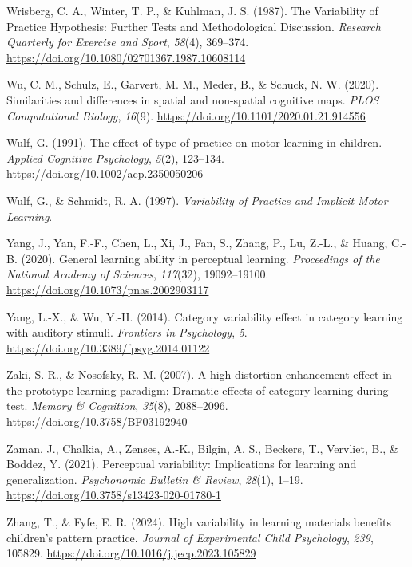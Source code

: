 \documentclass[
  11pt,
  letterpaper,
]{article}
\newlength{\cslhangindent}
\newenvironment{CSLReferences}[2] %
 {\begin{list}{}{%
  \setlength{\itemindent}{0pt}
  \setlength{\leftmargin}{0pt}
  \setlength{\parsep}{0pt}
  \ifodd #1
   \setlength{\leftmargin}{\cslhangindent}
   \setlength{\itemindent}{-1\cslhangindent}
  \fi
  \setlength{\itemsep}{#2\baselineskip}}}
 {\end{list}}
\begin{document}
\begin{CSLReferences}{1}{0}
Wrisberg, C. A., Winter, T. P., \& Kuhlman, J. S. (1987). The
{Variability} of {Practice Hypothesis}: {Further Tests} and
{Methodological Discussion}. \emph{Research Quarterly for Exercise and
Sport}, \emph{58}(4), 369--374.
\url{https://doi.org/10.1080/02701367.1987.10608114}

Wu, C. M., Schulz, E., Garvert, M. M., Meder, B., \& Schuck, N. W.
(2020). Similarities and differences in spatial and non-spatial
cognitive maps. \emph{PLOS Computational Biology}, \emph{16}(9).
\url{https://doi.org/10.1101/2020.01.21.914556}

Wulf, G. (1991). The effect of type of practice on motor learning in
children. \emph{Applied Cognitive Psychology}, \emph{5}(2), 123--134.
\url{https://doi.org/10.1002/acp.2350050206}

Wulf, G., \& Schmidt, R. A. (1997). \emph{Variability of {Practice} and
{Implicit Motor Learning}}.

Yang, J., Yan, F.-F., Chen, L., Xi, J., Fan, S., Zhang, P., Lu, Z.-L.,
\& Huang, C.-B. (2020). General learning ability in perceptual learning.
\emph{Proceedings of the National Academy of Sciences}, \emph{117}(32),
19092--19100. \url{https://doi.org/10.1073/pnas.2002903117}

Yang, L.-X., \& Wu, Y.-H. (2014). Category variability effect in
category learning with auditory stimuli. \emph{Frontiers in Psychology},
\emph{5}. \url{https://doi.org/10.3389/fpsyg.2014.01122}

Zaki, S. R., \& Nosofsky, R. M. (2007). A high-distortion enhancement
effect in the prototype-learning paradigm: {Dramatic} effects of
category learning during test. \emph{Memory \& Cognition}, \emph{35}(8),
2088--2096. \url{https://doi.org/10.3758/BF03192940}

Zaman, J., Chalkia, A., Zenses, A.-K., Bilgin, A. S., Beckers, T.,
Vervliet, B., \& Boddez, Y. (2021). Perceptual variability:
{Implications} for learning and generalization. \emph{Psychonomic
Bulletin \& Review}, \emph{28}(1), 1--19.
\url{https://doi.org/10.3758/s13423-020-01780-1}

Zhang, T., \& Fyfe, E. R. (2024). High variability in learning materials
benefits children's pattern practice. \emph{Journal of Experimental
Child Psychology}, \emph{239}, 105829.
\url{https://doi.org/10.1016/j.jecp.2023.105829}

\end{CSLReferences}
\end{document}

